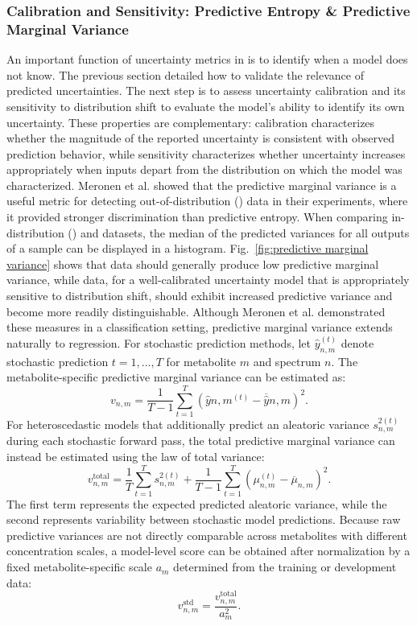 \subsubsection{Calibration and \OOD Sensitivity: Predictive Entropy \& Predictive Marginal Variance}
An important function of uncertainty metrics in \DL is to identify when a model does not know. The previous section detailed how to validate the relevance of predicted uncertainties. The next step is to assess uncertainty calibration and its sensitivity to distribution shift to evaluate the model’s ability to identify its own uncertainty. These properties are complementary: calibration characterizes whether the magnitude of the reported uncertainty is consistent with observed prediction behavior, while \OOD sensitivity characterizes whether uncertainty increases appropriately when inputs depart from the distribution on which the model was characterized. Meronen et al. \cite{Meronen2021} showed that the predictive marginal variance is a useful metric for detecting out-of-distribution (\OOD) data in their experiments, where it provided stronger \OOD discrimination than predictive entropy. When comparing in-distribution (\ID) and \OOD datasets, the median of the predicted variances for all outputs of a sample can be displayed in a histogram. Fig.~\ref{fig:predictive marginal variance} shows that \ID data should generally produce low predictive marginal variance, while \OOD data, for a well-calibrated uncertainty model that is appropriately sensitive to distribution shift, should exhibit increased predictive variance and become more readily distinguishable. Although Meronen et al. \cite{Meronen2021} demonstrated these measures in a classification setting, predictive marginal variance extends naturally to regression. For stochastic prediction methods, let $\hat{y}_{n,m}^{(t)}$ denote stochastic prediction $t=1,\ldots,T$ for metabolite $m$ and spectrum $n$. The metabolite-specific predictive marginal variance can be estimated as:
\begin{equation}
    v_{n,m} = \frac{1}{T-1} \sum_{t=1}^{T} \left(\hat{y}{n,m}^{(t)} - \overline{\hat{y}}{n,m}\right)^2.
\end{equation}
For heteroscedastic models that additionally predict an aleatoric variance $s_{n,m}^{2(t)}$ during each stochastic forward pass, the total predictive marginal variance can instead be estimated using the law of total variance:
\begin{equation}
    v_{n,m}^{\mathrm{total}} = \frac{1}{T}\sum_{t=1}^{T} s_{n,m}^{2(t)} + \frac{1}{T-1}\sum_{t=1}^{T} \left(\mu_{n,m}^{(t)} - \overline{\mu}_{n,m}\right)^2.
\end{equation}
The first term represents the expected predicted aleatoric variance, while the second represents variability between stochastic model predictions. Because raw predictive variances are not directly comparable across metabolites with different concentration scales, a model-level \OOD score can be obtained after normalization by a fixed metabolite-specific scale $a_m$ determined from the training or development data:
\begin{equation}
    v_{n,m}^{\mathrm{std}} = \frac{v_{n,m}^{\mathrm{total}}}{a_m^2}.
\end{equation}

